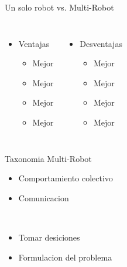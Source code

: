 \documentclass[
	11pt, %
]{beamer}
\newcommand\FourQuad[4]{%
  \begin{minipage}[b][.33\textheight][t] 
    {.48\textwidth}#1\end{minipage}\hfill%
    \begin{minipage}[b][.33\textheight][t] 
      {.48\textwidth}#2\end{minipage}\\[0.5em]
      \begin{minipage}[b][.33\textheight][t] 
        {.48\textwidth}#3\end{minipage}\hfill
        \begin{minipage}[b][.33\textheight][t] 
          {.48\textwidth}#4\end{minipage}%
}
\begin{document}
\begin{frame}{Un solo robot vs. Multi-Robot}
  \begin{columns}
    \begin{itemize}
    \item Ventajas
      \begin{itemize}
      \item Mejor
      \item Mejor
      \item Mejor
      \item Mejor
      \end{itemize}
    \end{itemize}
    \begin{itemize}
    \item Desventajas
      \begin{itemize}
      \item Mejor
      \item Mejor
      \item Mejor
      \item Mejor
      \end{itemize}
    \end{itemize}
  \end{columns}
\end{frame}

\begin{frame}{Taxonomia Multi-Robot}
  \FourQuad%
      { \begin{itemize}
        \item Comportamiento colectivo
        \end{itemize}\vspace{2cm}\hspace{2.7cm}
      }
      {
        \begin{itemize}
        \item Comunicacion
        \end{itemize}\vspace{2cm}\hspace{2.7cm}
        
      }
      {
        \begin{itemize}
        \item Tomar desiciones
        \end{itemize}\vspace{2cm}\hspace{2.7cm}
        
      }
      {
        \begin{itemize}
        \item Formulacion del problema
        \end{itemize}\vspace{2cm}\hspace{2.7cm}
      }

\end{frame}
\end{document}
